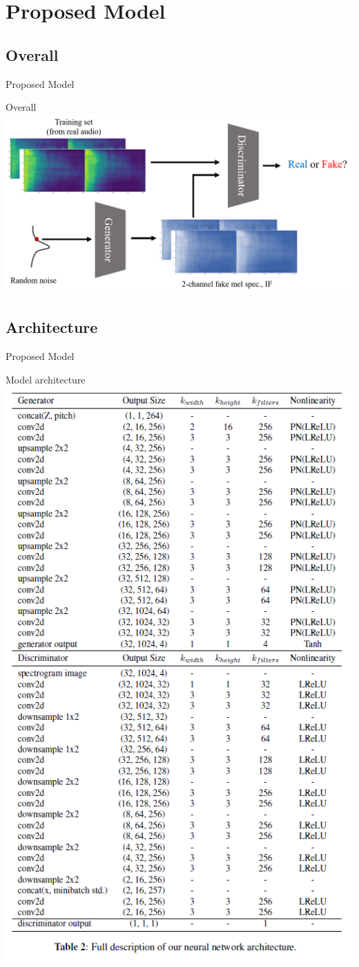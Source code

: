 \section{Proposed Model}
\subsection{Overall}
\begin{frame}{Proposed Model}
        \begin{block}{Overall}
        \centering
        \includegraphics[width=\linewidth]{Presentation/figures/model_overall.png}
    \end{block}
\end{frame}

\subsection{Architecture}
\begin{frame}{Proposed Model}
        \begin{block}{Model architecture}
        \centering
        \includegraphics[width=0.4\linewidth]{Presentation/figures/model_architecture.png}
    \end{block}
\end{frame}